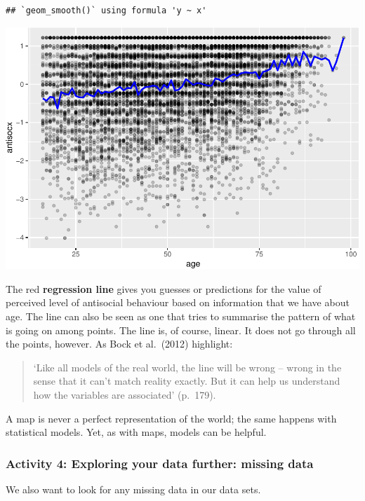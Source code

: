 \documentclass[
]{book}
\begin{document}
\begin{verbatim}
## `geom_smooth()` using formula 'y ~ x'
\end{verbatim}

\includegraphics{09-regression_files/figure-latex/unnamed-chunk-7-1.pdf}

The red \textbf{regression line} gives you guesses or predictions for the value of perceived level of antisocial behaviour based on information that we have about age. The line can also be seen as one that tries to summarise the pattern of what is going on among points. The line is, of course, linear. It does not go through all the points, however.
As Bock et al.~(2012) highlight:

\begin{quote}
`Like all models of the real world, the line will be wrong -- wrong in the sense that it can't match reality exactly. But it can help us understand how the variables are associated' (p.~179).
\end{quote}

A map is never a perfect representation of the world; the same happens with statistical models. Yet, as with maps, models can be helpful.

\hypertarget{activity-4-exploring-your-data-further-missing-data}{%
\subsubsection{Activity 4: Exploring your data further: missing data}\label{activity-4-exploring-your-data-further-missing-data}}

We also want to look for any missing data in our data sets.
\end{document}
